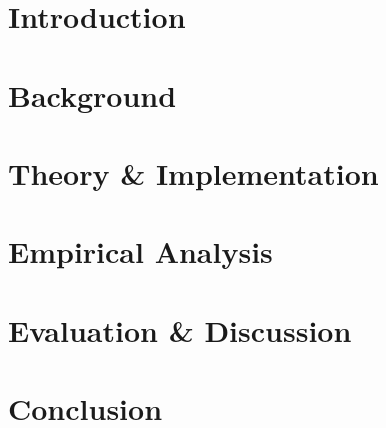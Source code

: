 

\usepackage{amsmath}
\usepackage{bm}
\usepackage{svg}

\def\innerproduct{\langle\cdot _, \cdot\rangle}
\def\orthseq{\{ \varphi_n \}_{n=0}^\infty}



\chapter{Introduction}







\chapter{Background}






\chapter{Theory \& Implementation}






\chapter{Empirical Analysis}




\chapter{Evaluation \& Discussion}


\chapter{Conclusion}





\appendix
\renewcommand{\chaptermark}[1]{\markboth{\MakeUppercase{\appendixname}\ \thechapter.\ #1}{}}






